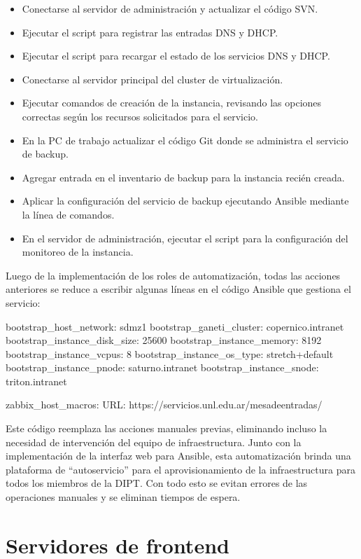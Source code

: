 \begin{itemize}
\item Conectarse al servidor de administración y actualizar el código
  SVN.
\item Ejecutar el script para registrar las entradas DNS y DHCP.
\item Ejecutar el script para recargar el estado de los servicios DNS
  y DHCP.
\item Conectarse al servidor principal del cluster de virtualización.
\item Ejecutar comandos de creación de la instancia, revisando las
  opciones correctas según los recursos solicitados para el servicio.
\item En la PC de trabajo actualizar el código Git donde se administra
  el servicio de backup.
\item Agregar entrada en el inventario de backup para la instancia
  recién creada.
\item Aplicar la configuración del servicio de backup ejecutando
  Ansible mediante la línea de comandos.
\item En el servidor de administración, ejecutar el script para la
  configuración del monitoreo de la instancia.
\end{itemize}
Luego de la implementación de los roles de automatización, todas las
acciones anteriores se reduce a escribir algunas líneas en el código
Ansible que gestiona el servicio:

\begin{verbatim*}
bootstrap_host_network: sdmz1
bootstrap_ganeti_cluster: copernico.intranet
bootstrap_instance_disk_size: 25600
bootstrap_instance_memory: 8192
bootstrap_instance_vcpus: 8
bootstrap_instance_os_type: stretch+default
bootstrap_instance_pnode: saturno.intranet
bootstrap_instance_snode: triton.intranet

zabbix_host_macros:
  URL: https://servicios.unl.edu.ar/mesadeentradas/
\end{verbatim*}

Este código reemplaza las acciones manuales previas, eliminando
incluso la necesidad de intervención del equipo de
infraestructura. Junto con la implementación de la interfaz web para
Ansible, esta automatización brinda una plataforma de ``autoservicio''
para el aprovisionamiento de la infraestructura para todos los
miembros de la DIPT. Con todo esto se evitan errores de las
operaciones manuales y se eliminan tiempos de espera.

\section{Servidores de frontend}

